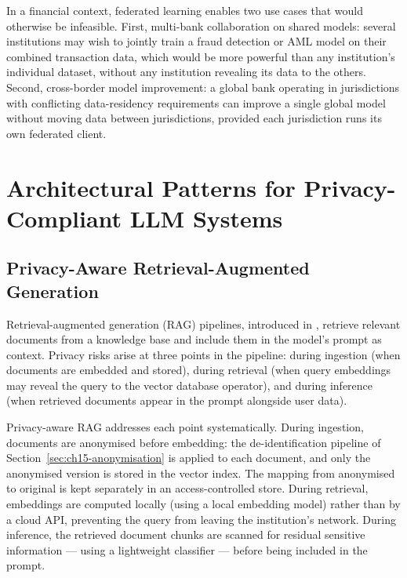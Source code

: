 In a financial context, federated learning enables two use cases that would otherwise be infeasible. First, multi-bank collaboration on shared models: several institutions may wish to jointly train a fraud detection or AML model on their combined transaction data, which would be more powerful than any institution's individual dataset, without any institution revealing its data to the others. Second, cross-border model improvement: a global bank operating in jurisdictions with conflicting data-residency requirements can improve a single global model without moving data between jurisdictions, provided each jurisdiction runs its own federated client.

\section{Architectural Patterns for Privacy-Compliant LLM Systems}
\label{sec:ch15-architecture}

\subsection{Privacy-Aware Retrieval-Augmented Generation}
\label{sec:ch15-rag}

Retrieval-augmented generation (RAG) pipelines, introduced in , retrieve relevant documents from a knowledge base and include them in the model's prompt as context. Privacy risks arise at three points in the pipeline: during ingestion (when documents are embedded and stored), during retrieval (when query embeddings may reveal the query to the vector database operator), and during inference (when retrieved documents appear in the prompt alongside user data).

Privacy-aware RAG addresses each point systematically. During ingestion, documents are anonymised before embedding: the de-identification pipeline of Section~\ref{sec:ch15-anonymisation} is applied to each document, and only the anonymised version is stored in the vector index. The mapping from anonymised to original is kept separately in an access-controlled store. During retrieval, embeddings are computed locally (using a local embedding model) rather than by a cloud API, preventing the query from leaving the institution's network. During inference, the retrieved document chunks are scanned for residual sensitive information — using a lightweight classifier — before being included in the prompt.

